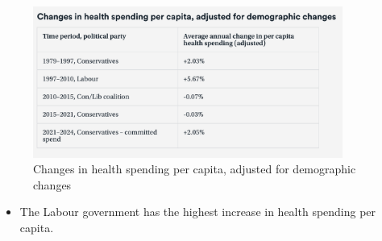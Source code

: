  \begin{figure}[H]%
                \centering
                \includegraphics[width=4in]{images/ch3/9.png}
                \caption{Changes in health spending per capita, adjusted for demographic changes}
                \label{fig:label}
            \end{figure} 
\begin{itemize}           
        \item The Labour government has the highest increase in health spending per capita.
        \end{itemize}  
          
